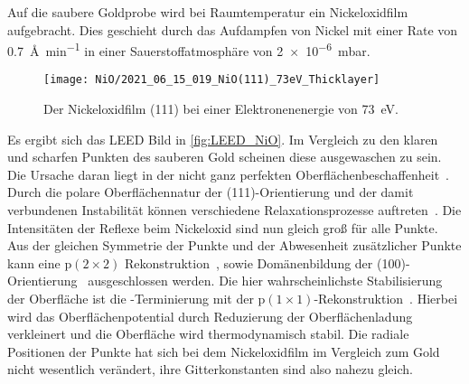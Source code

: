         Auf die saubere Goldprobe wird bei Raumtemperatur ein Nickeloxidfilm aufgebracht.
        Dies geschieht durch das Aufdampfen von Nickel mit einer Rate von \SI{0.7}{\angstrom\per\minute} in einer Sauerstoffatmosphäre von \SI{2e-6}{\milli\bar}.
        \begin{figure}
            \centering
            \texttt{[image: NiO/2021\_06\_15\_019\_NiO(111)\_73eV\_Thicklayer]}
            \caption{Der Nickeloxidfilm (111) bei einer Elektronenenergie von \SI{73}{\electronvolt}.}
            \label{fig:LEED_NiO}
        \end{figure}
        Es ergibt sich das LEED Bild in \autoref{fig:LEED_NiO}.
        Im Vergleich zu den klaren und scharfen Punkten des sauberen Gold scheinen diese ausgewaschen zu sein.
        Die Ursache daran liegt in der nicht ganz perfekten Oberflächenbeschaffenheit~\cite{NiO_34}.
        Durch die polare Oberflächennatur der (111)-Orientierung und der damit verbundenen Instabilität können verschiedene Relaxationsprozesse auftreten~\cite{NiO_36, NiO_35, NiO_34, NiO_27, NiO_10}.
        Die Intensitäten der Reflexe beim Nickeloxid sind nun gleich groß für alle Punkte.
        Aus der gleichen Symmetrie der Punkte und der Abwesenheit zusätzlicher Punkte kann eine $\text{p}(2 \times 2)$ Rekonstruktion~\cite{NiO_37}, sowie Domänenbildung der (100)-Orientierung~\cite{NiO_36} ausgeschlossen werden.
        Die hier wahrscheinlichste Stabilisierung der Oberfläche ist die -Terminierung mit der $\text{p}(1 \times 1)$-Rekonstruktion~\cite{NiO_35}.
        Hierbei wird das Oberflächenpotential durch Reduzierung der Oberflächenladung verkleinert und die Oberfläche wird thermodynamisch stabil.
        Die radiale Positionen der Punkte hat sich bei dem Nickeloxidfilm im Vergleich zum Gold nicht wesentlich verändert, ihre Gitterkonstanten sind also nahezu gleich.


